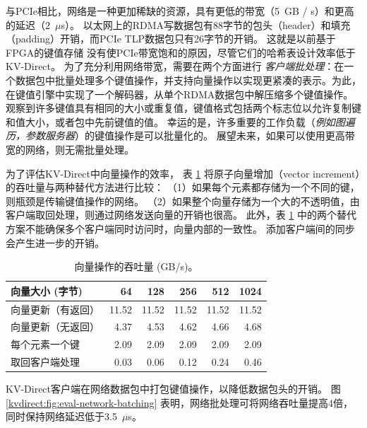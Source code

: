 与PCIe相比，网络是一种更加稀缺的资源，具有更低的带宽（5~GB / s）和更高的延迟（2~$\mu$s）。
以太网上的RDMA写数据包有88字节的包头（header）和填充（padding）开销，而PCIe TLP数据包只有26字节的开销。
这就是以前基于FPGA的键值存储 \cite{blott13hotcloud,blott2015scaling} 没有使PCIe带宽饱和的原因，尽管它们的哈希表设计效率低于KV-Direct。
为了充分利用网络带宽，需要在两个方面进行 \textit {客户端批处理}：在一个数据包中批量处理多个键值操作，并支持向量操作以实现更紧凑的表示。为此，在键值引擎中实现了一个解码器，从单个RDMA数据包中解压缩多个键值操作。
观察到许多键值具有相同的大小或重复值，键值格式包括两个标志位以允许复制键和值大小，或者包中先前键值的值。
幸运的是，许多重要的工作负载（\textit {例如图遍历，参数服务器}）的键值操作是可以批量化的。
展望未来，如果可以使用更高带宽的网络，则无需批量处理。


为了评估KV-Direct中向量操作的效率，
表 \ref {kvdirect:tab:vec_throughput} 将原子向量增加（vector increment）的吞吐量与两种替代方法进行比较：
（1）如果每个元素都存储为一个不同的键，则瓶颈是传输键值操作的网络。
（2）如果整个向量存储为一个大的不透明值，由客户端取回处理，则通过网络发送向量的开销也很高。
此外，表 \ref {kvdirect:tab:vec_throughput} 中的两个替代方案不能确保多个客户端同时访问时，向量内部的一致性。 添加客户端间的同步会产生进一步的开销。


\begin{table}[htbp]
	\centering
	\caption{向量操作的吞吐量 (GB/s)。}
	\label{kvdirect:tab:vec_throughput}
	\small
		\begin{tabular}{|l|r|r|r|r|r|}
			\hline
			向量大小 (字节)              & 64    & 128   & 256   & 512   & 1024  \\ \hline
			向量更新（有返回）    & 11.52 & 11.52 & 11.52 & 11.52 & 11.52 \\ \hline
			向量更新（无返回） & 4.37  & 4.53  & 4.62  & 4.66  & 4.68  \\ \hline
			每个元素一个键         & 2.09  & 2.09  & 2.09  & 2.09  & 2.09  \\ \hline
			取回客户端处理             & 0.03  & 0.06  & 0.12  & 0.24  & 0.46  \\ \hline
		\end{tabular}
\end{table}




KV-Direct客户端在网络数据包中打包键值操作，以降低数据包头的开销。
图 \ref {kvdirect:fig:eval-network-batching} 表明，网络批处理可将网络吞吐量提高4倍，同时保持网络延迟低于3.5~$\mu$s。


